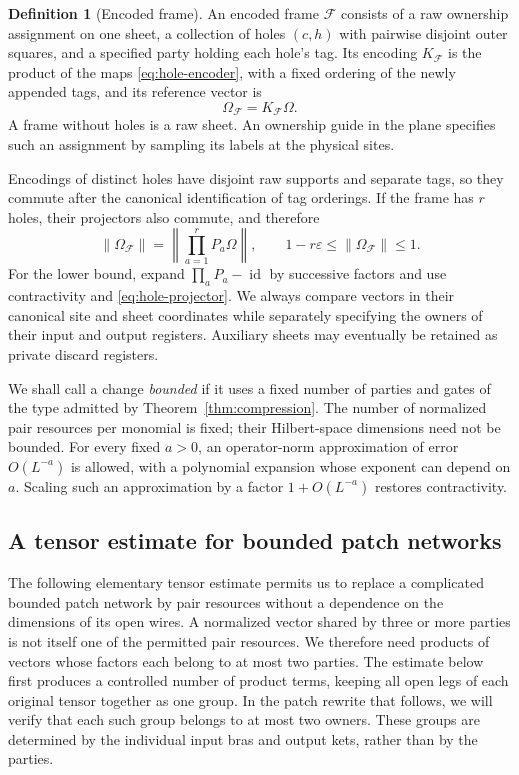 \documentclass[11pt]{article}
\numberwithin{equation}{section}
\theoremstyle{definition}
\newtheorem{definition}[theorem]{Definition}
\theoremstyle{remark}
\begin{document}
\begin{definition}[Encoded frame]\label{def:frame}
An encoded frame $\mathcal F$ consists of a raw ownership assignment on one
sheet, a collection of holes $(c,h)$ with pairwise disjoint outer squares,
and a specified party holding each hole's tag.  Its encoding $K_{\mathcal F}$
is the product of the maps \eqref{eq:hole-encoder}, with a fixed ordering of
the newly appended tags, and its reference vector is
\begin{equation}\label{eq:frame-vector}
  \Omega_{\mathcal F}=K_{\mathcal F}\Omega.
\end{equation}
A frame without holes is a raw sheet.  An ownership guide in the plane
specifies such an assignment by sampling its labels at the physical sites.
\end{definition}

Encodings of distinct holes have disjoint raw supports and separate tags,
so they commute after the canonical identification of tag orderings.
If the frame has $r$ holes, their projectors also commute, and therefore
\begin{equation}\label{eq:frame-norm}
 \lVert \Omega_{\mathcal F}\rVert
   =\left\|\prod_{a=1}^{r}P_a\Omega\right\|,
 \qquad
 1-r\varepsilon\le\lVert \Omega_{\mathcal F}\rVert\le1.
\end{equation}
For the lower bound, expand $\prod_aP_a-\operatorname{id}$ by successive factors and use
contractivity and \eqref{eq:hole-projector}.  We always compare vectors in
their canonical site and sheet coordinates while separately specifying the
owners of their input and output registers.  Auxiliary sheets may eventually
be retained as private discard registers.

We shall call a change \emph{bounded} if it uses a fixed number of parties
and gates of the type admitted by Theorem~\ref{thm:compression}.  The number
of normalized pair resources per monomial is fixed; their Hilbert-space
dimensions need not be bounded.  For every fixed $a>0$, an operator-norm
approximation of error $O(L^{-a})$ is allowed, with a polynomial expansion
whose exponent can depend on $a$.  Scaling such an approximation by a
factor $1+O(L^{-a})$ restores contractivity.

\subsection{A tensor estimate for bounded patch networks}

The following elementary tensor estimate permits us to replace a complicated
bounded patch network by pair resources without a dependence on the
dimensions of its open wires.  A normalized vector shared by three or more
parties is not itself one of the permitted pair resources.  We therefore
need products of vectors whose factors each belong to at most two parties.
The estimate below first produces a controlled number of product terms,
keeping all open legs of each original tensor together as one group.
In the patch rewrite that follows, we will verify that each such group
belongs to at most two owners.  These groups are determined by the
individual input bras and output kets, rather than by the parties.
\end{document}
